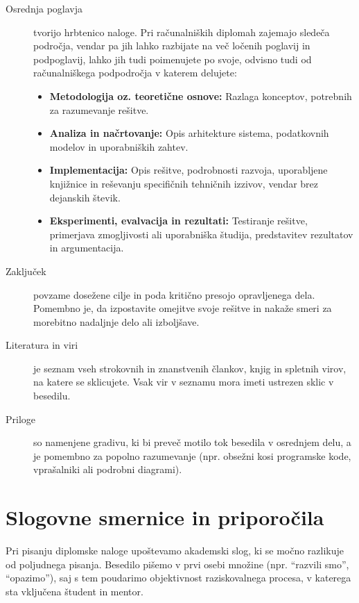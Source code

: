 \documentclass[a4paper,12pt,openright]{book}
\begin{document}
\begin{description}
    \item[Osrednja poglavja] tvorijo hrbtenico naloge. Pri računalniških diplomah zajemajo sledeča področja, vendar pa jih lahko razbijate na več ločenih poglavij in podpoglavij, lahko jih tudi poimenujete po svoje, odvisno tudi od računalniškega podpodročja v katerem delujete:
    \begin{itemize}
        \item \textbf{Metodologija oz. teoretične osnove:} Razlaga konceptov, potrebnih za razumevanje rešitve.
        \item \textbf{Analiza in načrtovanje:} Opis arhitekture sistema, podatkovnih modelov in uporabniških zahtev.
        \item \textbf{Implementacija:} Opis rešitve, podrobnosti razvoja, uporabljene knjižnice in reševanju specifičnih tehničnih izzivov, vendar brez dejanskih števik.
        \item \textbf{Eksperimenti, evalvacija in rezultati:} Testiranje rešitve, primerjava zmogljivosti ali uporabniška študija, predstavitev rezultatov in argumentacija.
    \end{itemize}
    
    \item[Zaključek] povzame dosežene cilje in poda kritično presojo opravljenega dela. Pomembno je, da izpostavite omejitve svoje rešitve in nakaže smeri za morebitno nadaljnje delo ali izboljšave.
    
    \item[Literatura in viri] je seznam vseh strokovnih in znanstvenih člankov, knjig in spletnih virov, na katere se sklicujete. Vsak vir v seznamu mora imeti ustrezen sklic v besedilu.
    
    \item[Priloge] so namenjene gradivu, ki bi preveč motilo tok besedila v osrednjem delu, a je pomembno za popolno razumevanje (npr. obsežni kosi programske kode, vprašalniki ali podrobni diagrami).
\end{description}

\section{Slogovne smernice in priporočila}

Pri pisanju diplomske naloge upoštevamo akademski slog, ki se močno razlikuje od poljudnega pisanja. Besedilo pišemo v prvi osebi množine (npr. \enquote{razvili smo}, \enquote{opazimo}), saj s tem poudarimo objektivnost raziskovalnega procesa, v katerega sta vključena študent in mentor.
\end{document}
